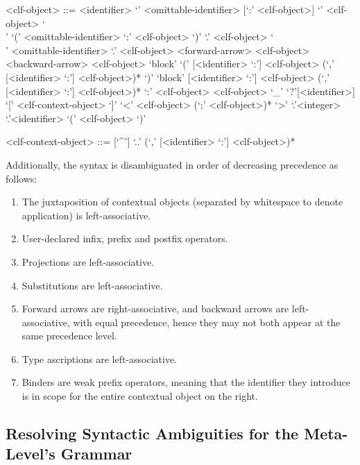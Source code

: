 \begin{grammar}
<clf-object> ::= <identifier>
\alt `{' <omittable-identifier> [`:' <clf-object>] `}' <clf-object>
\alt `\\' `(' <omittable-identifier> `:' <clf-object> `)' `.' <clf-object>
\alt `\\' <omittable-identifier> `.' <clf-object>
 <forward-arrow> <clf-object>
 <backward-arrow> <clf-object>
\alt `block' `(' [<identifier> `:'] <clf-object> (`,' [<identifier> `:'] <clf-object>)* `)'
\alt `block' [<identifier> `:'] <clf-object> (`,' [<identifier> `:'] <clf-object>)*
 `:' <clf-object>
 <clf-object>
\alt `_'
\alt `?'[<identifier>]
 `[' <clf-context-object> `]'
\alt `<' <clf-object> (`;' <clf-object>)* `>'
`.'<integer>
`.'<identifier>
\alt `(' <clf-object> `)'

<clf-context-object> ::= [`^']
\alt `..'
 (`,' [<identifier> `:'] <clf-object>)*
\end{grammar}

Additionally, the syntax is disambiguated in order of decreasing precedence as follows:

\begin{enumerate}
\item The juxtaposition of contextual \LF objects (separated by whitespace to denote application) is left-associative.
\item User-declared infix, prefix and postfix operators.
\item Projections are left-associative.
\item Substitutions are left-associative.
\item Forward arrows are right-associative, and backward arrows are left-associative, with equal precedence, hence they may not both appear at the same precedence level.
\item Type ascriptions are left-associative.
\item Binders are weak prefix operators, meaning that the identifier they introduce is in scope for the entire contextual \LF object on the right.
\end{enumerate}

\subsection{Resolving Syntactic Ambiguities for the Meta-Level's Grammar}

